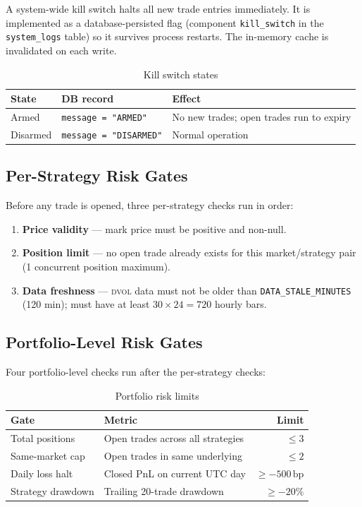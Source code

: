 \documentclass[12pt, a4paper]{article}
\theoremstyle{definition}
\newcommand{\bp}{\,\text{bp}}
\newcommand{\DVOL}{\textsc{dvol}}
\begin{document}
A system-wide kill switch halts all new trade entries immediately. It is
implemented as a database-persisted flag (component \texttt{kill\_switch} in
the \texttt{system\_logs} table) so it survives process restarts. The in-memory
cache is invalidated on each write.

\begin{table}[H]
\centering
\caption{Kill switch states}
\begin{tabular}{lll}
\toprule
\textbf{State} & \textbf{DB record} & \textbf{Effect} \\
\midrule
Armed    & \texttt{message = "ARMED"}    & No new trades; open trades run to expiry \\
Disarmed & \texttt{message = "DISARMED"} & Normal operation \\
\bottomrule
\end{tabular}
\end{table}

\subsection{Per-Strategy Risk Gates}

Before any trade is opened, three per-strategy checks run in order:

\begin{enumerate}[leftmargin=2em]
    \item \textbf{Price validity} — mark price must be positive and non-null.
    \item \textbf{Position limit} — no open trade already exists for this
          market/strategy pair (1 concurrent position maximum).
    \item \textbf{Data freshness} — \DVOL{} data must not be older than
          \texttt{DATA\_STALE\_MINUTES} (120 min); must have at least
          $30 \times 24 = 720$ hourly bars.
\end{enumerate}

\subsection{Portfolio-Level Risk Gates}

Four portfolio-level checks run after the per-strategy checks:

\begin{table}[H]
\centering
\caption{Portfolio risk limits}
\begin{tabular}{llr}
\toprule
\textbf{Gate} & \textbf{Metric} & \textbf{Limit} \\
\midrule
Total positions    & Open trades across all strategies    & $\leq 3$ \\
Same-market cap   & Open trades in same underlying       & $\leq 2$ \\
Daily loss halt   & Closed PnL on current UTC day        & $\geq -500\bp$ \\
Strategy drawdown & Trailing 20-trade drawdown            & $\geq -20\%$ \\
\bottomrule
\end{tabular}
\end{table}
\end{document}
